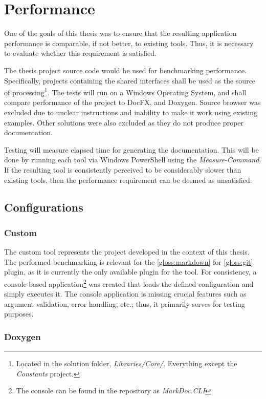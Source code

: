 \chapter{Performance}

One of the goals of this thesis was to ensure that the resulting application performance is comparable, if not better, to existing tools. Thus, it is necessary to evaluate whether this requirement is satisfied.

The thesis project source code would be used for benchmarking performance.
Specifically, projects containing the shared interfaces shall be used as the source of processing\footnote{Located in the solution folder, \textit{Libraries/Core/}. Everything except the \textit{Constants} project.}.
The tests will run on a Windows Operating System, and shall compare performance of the project to DocFX, and Doxygen. Source browser was excluded due to unclear instructions and inability to make it work using existing examples. Other solutions were also excluded as they do not produce proper documentation.

Testing will measure elapsed time for generating the documentation. This will be done by running each tool via Windows PowerShell using the \textit{Measure-Command}. If the resulting tool is consistently perceived to be considerably slower than existing tools, then the performance requirement can be deemed as unsatisfied.

\section{Configurations}

\subsection{Custom}

The custom tool represents the project developed in the context of this thesis.
The performed benchmarking is relevant for the \ref{gloss:markdown} for \ref{gloss:git} plugin, as it is currently the only available plugin for the tool.
For consistency, a console-based application\footnote{The console can be found in the repository as \textit{MarkDoc.CLI}} was created that loads the defined configuration and simply executes it.
The console application is missing crucial features such as argument validation, error handling, etc.; thus, it primarily serves for testing purposes.

\subsection{Doxygen}

